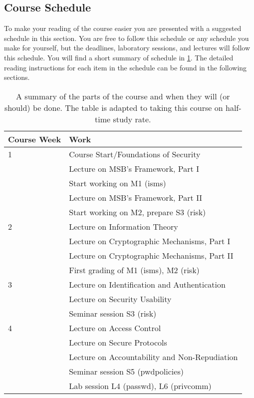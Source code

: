 \documentclass[a4paper]{llncs}
\begin{document}
\subsection{Course Schedule}
\label{sec:schedule}
To make your reading of the course easier you are presented with a suggested 
schedule in this section.
You are free to follow this schedule or any schedule you make for yourself, but 
the deadlines, laboratory sessions, and lectures will follow this schedule.
You will find a short summary of schedule in \cref{Schedule}.
The detailed reading instructions for each item in the schedule can be found in 
the following sections.

\begin{table}
	\centering
  \caption{%
    A summary of the parts of the course and when they will (or should) be 
    done.
    The table is adapted to taking this course on half-time study rate.
  }\label{Schedule}
  \begin{tabular}{lp{9cm}}
    \toprule
    \textbf{Course Week}	& \textbf{Work} \\
    \midrule
    1
      & Course Start/Foundations of Security\\
      & Lecture on MSB's Framework, Part I\\
      & Start working on M1 (isms)\\
      & Lecture on MSB's Framework, Part II\\
      & Start working on M2, prepare S3 (risk)\\
    \midrule
    2
      & Lecture on Information Theory\\
      & Lecture on Cryptographic Mechanisms, Part I\\
      & Lecture on Cryptographic Mechanisms, Part II\\
      & First grading of M1 (isms), M2 (risk)\\
    \midrule
    3
      & Lecture on Identification and Authentication\\
      & Lecture on Security Usability\\
      & Seminar session S3 (risk)\\
    \midrule
    4
      & Lecture on Access Control\\
      & Lecture on Secure Protocols\\
      & Lecture on Accountability and Non-Repudiation\\
      & Seminar session S5 (pwdpolicies)\\
      & Lab session L4 (passwd), L6 (privcomm)\\

\end{tabular}
\end{table}
\end{document}
